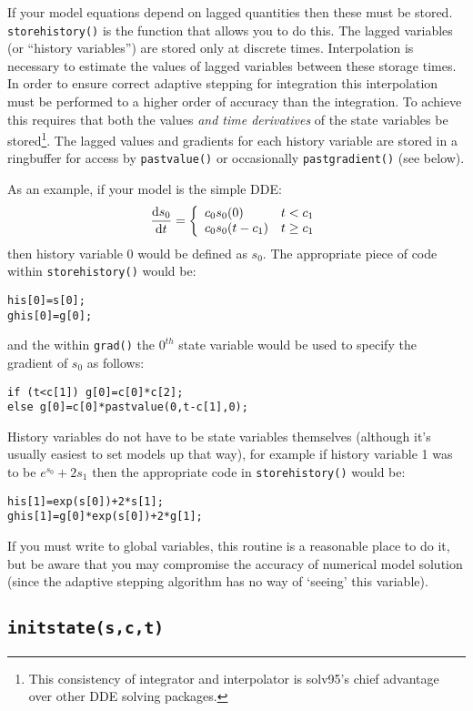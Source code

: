 \documentclass[10pt] {article}
\newcommand{\dif}[2]{\frac{{\rm d} #1}{{\rm d} #2}}
\begin{document}
If your model equations depend on lagged quantities then these must be stored. %
\verb+storehistory()+ is the function that allows you to do this. The lagged variables (or %
``history variables'') are stored only at discrete times. Interpolation is necessary to estimate %
the values of lagged variables between these storage times. In order to ensure correct adaptive %
stepping for integration this interpolation must be performed to a higher order of accuracy than %
the integration. To achieve this requires that both the values {\it and time derivatives} of the %
state variables be stored\footnote{This consistency of integrator and interpolator is solv95's %
chief advantage over other DDE solving packages.}. The lagged values and gradients for each %
history variable are stored in a ringbuffer for access by \verb+pastvalue()+ or occasionally %
\verb+pastgradient()+ (see below). 

As an example, if your model is the simple DDE:
$$
\dif{s_0}{t} = \left \{ \begin{array}{lc} c_0s_0(0) & t<c_1 \\ c_0s_0(t-c_1) & t\ge c_1 %
\end{array} \right .
$$
then history variable 0 would be defined as $s_0$. The appropriate piece of code within %
\verb+storehistory()+ would be:
\begin{verbatim}
his[0]=s[0];
ghis[0]=g[0];
\end{verbatim}
and the within \verb+grad()+ the $0^{th}$ state variable would be used to specify the gradient of %
$s_0$ as follows:
\begin{verbatim}
if (t<c[1]) g[0]=c[0]*c[2];
else g[0]=c[0]*pastvalue(0,t-c[1],0);
\end{verbatim}

History variables do not have to be state variables themselves (although it's usually easiest to %
set models up that way), for example if history variable 1 was to be $ e^{s_0}+ 2 s_1$ then the %
appropriate code in \verb+storehistory()+ would be:
\begin{verbatim}
his[1]=exp(s[0])+2*s[1];
ghis[1]=g[0]*exp(s[0])+2*g[1];
\end{verbatim}

If you must write to global variables, this routine is a reasonable place to do it, but be aware %
that you may compromise the accuracy of numerical model solution (since the adaptive stepping %
algorithm has no way of `seeing' this variable).

\subsection{\tt initstate(s,c,t)}
\end{document}

